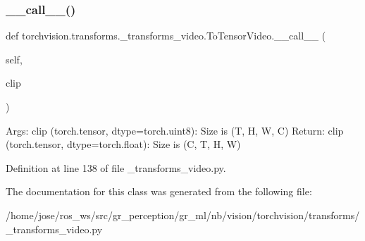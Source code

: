 \subsubsection{\texorpdfstring{\+\_\+\+\_\+call\+\_\+\+\_\+()}{\_\_call\_\_()}}
{\footnotesize\ttfamily def torchvision.\+transforms.\+\_\+transforms\+\_\+video.\+To\+Tensor\+Video.\+\_\+\+\_\+call\+\_\+\+\_\+ (\begin{DoxyParamCaption}\item[{}]{self,  }\item[{}]{clip }\end{DoxyParamCaption})}

\begin{DoxyVerb}Args:
    clip (torch.tensor, dtype=torch.uint8): Size is (T, H, W, C)
Return:
    clip (torch.tensor, dtype=torch.float): Size is (C, T, H, W)
\end{DoxyVerb}
 

Definition at line 138 of file \+\_\+transforms\+\_\+video.\+py.



The documentation for this class was generated from the following file\+:\begin{DoxyCompactItemize}
\item 
/home/jose/ros\+\_\+ws/src/gr\+\_\+perception/gr\+\_\+ml/nb/vision/torchvision/transforms/\+\_\+transforms\+\_\+video.\+py\end{DoxyCompactItemize}
